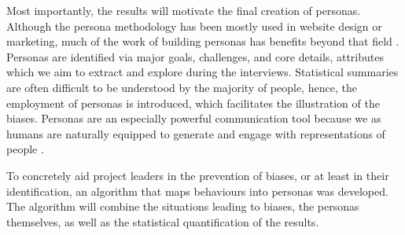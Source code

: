 Most importantly, the results will motivate the final creation of personas. Although the persona methodology has been mostly used in website design or marketing, much of the work of building personas has benefits beyond that field \cite{Madsen2014}. Personas are identified via major goals, challenges, and core details, attributes which we aim to extract and explore during the interviews. Statistical summaries are often difficult to be understood by the majority of people, hence, the employment of personas is introduced, which facilitates the illustration of the biases. Personas are an especially powerful communication tool because we as humans are naturally equipped to generate and engage with representations of people \cite{Grudin2006}. 

To concretely aid project leaders in the prevention of biases, or at least in their identification, an algorithm that maps behaviours into personas was developed. The algorithm will combine the situations leading to biases, the personas themselves, as well as the statistical quantification of the results.